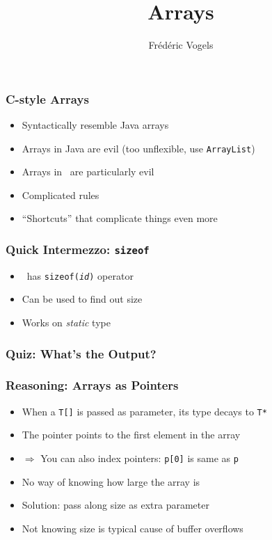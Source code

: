\documentclass{../ucll-slides}
\title{Arrays}
\author{Fr\'ed\'eric Vogels}
\begin{document}
\begin{frame}
  \titlepage
\end{frame}

\begin{frame}
  \frametitle{C-style Arrays}
  \begin{itemize}
    \item Syntactically resemble Java arrays
    \item Arrays in Java are evil (too unflexible, use {\tt ArrayList})
    \item Arrays in \cpp\ are particularly evil
    \item Complicated rules
    \item ``Shortcuts'' that complicate things even more
  \end{itemize}
\end{frame}

\begin{frame}
  \frametitle{Quick Intermezzo: {\tt sizeof}}
  \begin{itemize}
    \item \cpp\ has {\tt sizeof({\it id})} operator
    \item Can be used to find out size
    \item Works on \emph{static} type
  \end{itemize}
\end{frame}

\begin{frame}
  \frametitle{Quiz: What's the Output?}
\end{frame}

\begin{frame}
  \frametitle{Reasoning: Arrays as Pointers}
  \begin{itemize}
    \item When a {\tt T[]} is passed as parameter, its type decays to {\tt T*}
    \item The pointer points to the first element in the array
    \item $\Rightarrow$ You can also index pointers: {\tt p[0]} is same as {\tt *p}
    \item No way of knowing how large the array is
    \item Solution: pass along size as extra parameter
    \item Not knowing size is typical cause of buffer overflows
  \end{itemize}
\end{frame}
\end{document}
